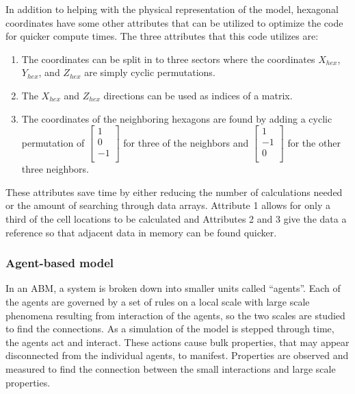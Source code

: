 In addition to helping with the physical representation of the model, hexagonal coordinates have some other attributes that can be utilized to optimize the code for quicker compute times. The three attributes that this code utilizes are:
\begin{enumerate} 
    \item The coordinates can be split in to three sectors where the coordinates $X_{hex}$, $Y_{hex}$, and $Z_{hex}$ are simply cyclic permutations.
    \item The $X_{hex}$ and $Z_{hex}$ directions can be used as indices of a matrix.
    \item The coordinates of the neighboring hexagons are found by adding a cyclic permutation of 
        $\left [
            \begin{array}{c}
                1 \\
                0 \\
                -1\\
            \end{array}
        \right ]$
        for three of the neighbors and
        $\left [ 
            \begin{array}{c}
                1 \\
                -1 \\
                0\\
            \end{array}
        \right ]$
        for the other three neighbors.
\end{enumerate}
These attributes save time by either reducing the number of calculations needed or the amount of searching through data arrays. Attribute 1 allows for only a third of the cell locations to be calculated and Attributes 2 and 3 give the data a reference so that adjacent data in memory can be found quicker.

\subsubsection{Agent-based model} \label{ABM}

In an ABM, a system is broken down into smaller units called ``agents''. Each of the agents are governed by a set of rules on a local scale with large scale phenomena resulting from interaction of the agents, so the two scales are studied to find the connections. As a simulation of the model is stepped through time, the agents act and interact. These actions cause bulk properties, that may appear disconnected from the individual agents, to manifest. Properties are observed and measured to find the connection between the small interactions and large scale properties.


